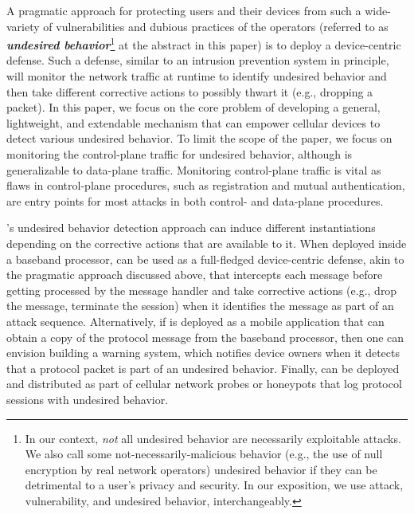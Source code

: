 A pragmatic approach for protecting users and their devices from such a wide-variety
of vulnerabilities and dubious practices of the operators
(referred to as \textbf{\emph{undesired behavior}}\footnote{
	In our context, \emph{not} all undesired behavior are necessarily exploitable
	attacks. We also call some not-necessarily-malicious behavior (e.g., the use of null encryption by real network operators)
	undesired behavior if they can be detrimental to a user's privacy and security. In our exposition, we use
	attack, vulnerability, and undesired behavior, interchangeably.
	}
at the abstract in this paper) is to deploy a device-centric defense.
Such a defense, similar to an intrusion prevention system in principle, will monitor the network traffic at
runtime to identify undesired behavior and then take different corrective actions to possibly thwart it
(e.g., dropping a packet). In this paper, we focus on the core problem of
developing a general, lightweight, and extendable mechanism \system that can empower cellular devices
to detect various undesired behavior. %
To limit the scope of the paper, we focus on monitoring the control-plane traffic for undesired behavior,
although \system is generalizable to data-plane traffic. Monitoring control-plane traffic is vital as
flaws in control-plane procedures, such as registration and mutual authentication, are
entry points for most attacks in both control- and data-plane procedures.

\system{}'s undesired behavior detection approach can induce different instantiations depending on the corrective
actions that are available to it. When deployed inside a baseband processor, \system can be used as a full-fledged
device-centric defense, akin to the pragmatic approach discussed above, that intercepts each message before getting
processed by the message handler and take corrective actions (e.g., drop the message, terminate the session) when it
identifies the message as part of an attack sequence. Alternatively, if \system is deployed as a mobile application that
can obtain a copy of the protocol message from the baseband processor, then one can envision building a warning system, which
notifies device owners when it detects that a protocol packet is part of an undesired behavior. Finally, \system can be
deployed and distributed as part of cellular network probes or honeypots that log protocol sessions with undesired behavior.




